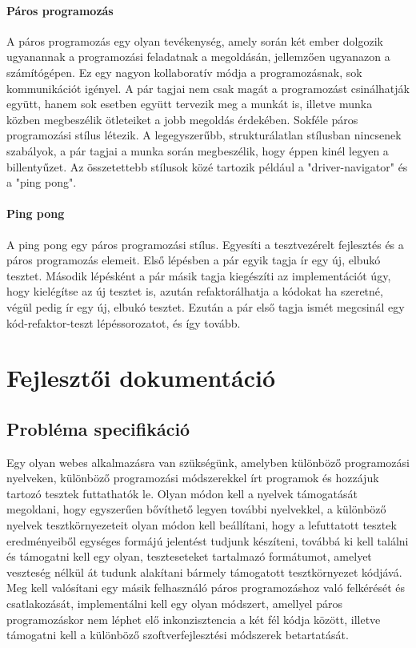 \documentclass{elteikthesis}
\begin{document}
		\subsubsection{Páros programozás}
			A páros programozás \cite{pairprogramming} egy olyan tevékenység, amely során két ember dolgozik ugyanannak a programozási feladatnak a megoldásán, jellemzően ugyanazon a számítógépen. Ez egy nagyon kollaboratív módja a programozásnak, sok kommunikációt igényel. A pár tagjai nem csak magát a programozást csinálhatják együtt, hanem sok esetben együtt tervezik meg a munkát is, illetve munka közben megbeszélik ötleteiket a jobb megoldás érdekében. Sokféle páros programozási stílus létezik. A legegyszerűbb, strukturálatlan stílusban nincsenek szabályok, a pár tagjai a munka során megbeszélik, hogy éppen kinél legyen a billentyűzet. Az összetettebb stílusok közé tartozik például a "driver-navigator" és a "ping pong".

		\subsubsection{Ping pong}
			A ping pong \cite{pairprogramming} egy páros programozási stílus. Egyesíti a tesztvezérelt fejlesztés és a páros programozás elemeit. Első lépésben a pár egyik tagja ír egy új, elbukó tesztet. Második lépésként a pár másik tagja kiegészíti az implementációt úgy, hogy kielégítse az új tesztet is, azután refaktorálhatja a kódokat ha szeretné, végül pedig ír egy új, elbukó tesztet. Ezután a pár első tagja ismét megcsinál egy kód-refaktor-teszt lépéssorozatot, és így tovább.

	\chapter{Fejlesztői dokumentáció}

		\section{Probléma specifikáció}
			Egy olyan webes alkalmazásra van szükségünk, amelyben különböző programozási nyelveken, különböző programozási módszerekkel írt programok és hozzájuk tartozó tesztek futtathatók le. Olyan módon kell a nyelvek támogatását megoldani, hogy egyszerűen bővíthető legyen további nyelvekkel, a különböző nyelvek tesztkörnyezeteit olyan módon kell beállítani, hogy a lefuttatott tesztek eredményeiből egységes formájú jelentést tudjunk készíteni, továbbá ki kell találni és támogatni kell egy olyan, teszteseteket tartalmazó formátumot, amelyet veszteség nélkül át tudunk alakítani bármely támogatott tesztkörnyezet kódjává. Meg kell valósítani egy másik felhasználó páros programozáshoz való felkérését és csatlakozását, implementálni kell egy olyan módszert, amellyel páros programozáskor nem léphet elő inkonzisztencia a két fél kódja között, illetve támogatni kell a különböző szoftverfejlesztési módszerek betartatását.
\end{document}
